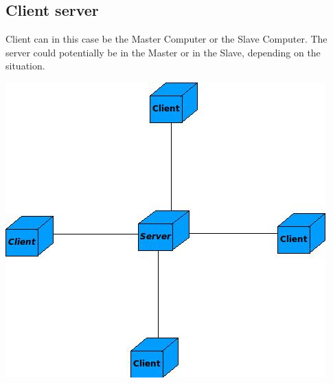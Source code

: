 \documentclass[a4paper,12pt,final]{article}
\begin{document}
\subsection{Client server}
Client can in this case be the Master Computer or the Slave Computer. The server could potentially be in the Master or in the Slave, depending on the situation.\\
\begin{center}
  	\includegraphics[scale=0.6]{ClientServer.jpeg} 
\end{center}

\newpage
\end{document}
